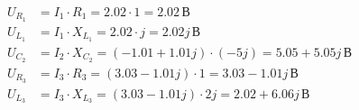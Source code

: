 \documentclass[12pt,a4paper]{article}
\begin{document}
\begin{equation*}
  \begin{aligned}
    U_{R_1} &= I_1 \cdot R_1 = 2.02 \cdot 1 = 2.02\,\text{В} \\
    U_{L_1} &= I_1 \cdot X_{L_1} = 2.02 \cdot j = 2.02j\,\text{В} \\
    U_{C_2} &= I_2 \cdot X_{C_2} = (-1.01 + 1.01j) \cdot (-5j) = 5.05 + 5.05j\,\text{В} \\
    U_{R_3} &= I_3 \cdot R_3 = (3.03 - 1.01j) \cdot 1 = 3.03 - 1.01j\,\text{В} \\
    U_{L_3} &= I_3 \cdot X_{L_3} = (3.03 - 1.01j) \cdot 2j = 2.02 + 6.06j\,\text{В} \\
  \end{aligned}
\end{equation*}
\end{document}
